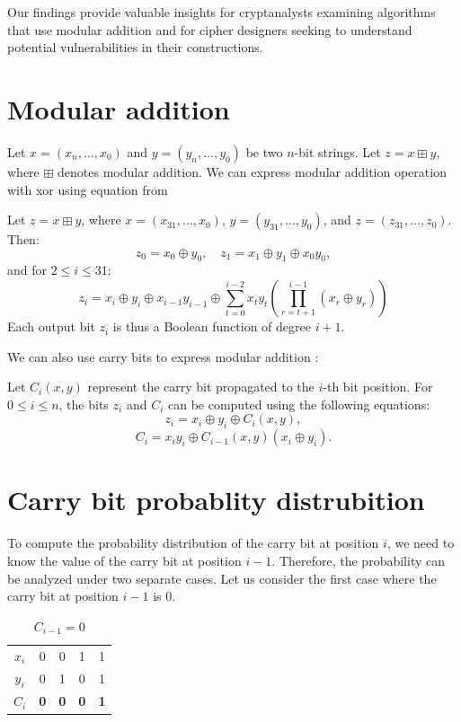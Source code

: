 \documentclass[runningheads]{llncs}
\begin{document}
Our findings provide valuable insights for cryptanalysts examining algorithms that use modular addition and for cipher designers seeking to understand potential vulnerabilities in their constructions.


\section{Modular addition}

Let \( x = (x_n, \dots, x_0) \) and \( y = (y_n, \dots, y_0) \) be two \( n \)-bit strings. Let \( z = x \boxplus y \), where \( \boxplus \) denotes modular addition. We can express modular addition operation with xor using equation from \cite{Dehnavi2014} 
\begin{lemma}
    Let \( z = x \boxplus y \), where \( x = (x_{31}, \ldots, x_0) \), \( y = (y_{31}, \ldots, y_0) \), and \( z = (z_{31}, \ldots, z_0) \). Then:
    \[
    z_0 = x_0 \oplus y_0, \quad z_1 = x_1 \oplus y_1 \oplus x_0 y_0,
    \]
    and for \( 2 \leq i \leq 31 \):
    \[
    z_i = x_i \oplus y_i \oplus x_{i-1} y_{i-1} \oplus \sum_{t=0}^{i-2} x_t y_t \left( \prod_{r=t+1}^{i-1} (x_r \oplus y_r) \right)
    \]
    Each output bit \( z_i \) is thus a Boolean function of degree \( i + 1 \).
\end{lemma}

We can also use carry bits to express modular addition :
\begin{lemma}
    Let \( C_i(x, y) \) represent the carry bit propagated to the \( i \)-th bit position. For \( 0 \leq i \leq n \), the bits \( z_i \) and \( C_i \) can be computed using the following equations:
    \[
    z_i = x_i \oplus y_i \oplus C_i(x,y),
    \]
    \[
    C_i = x_i y_i \oplus C_{i-1}(x,y)(x_i \oplus y_i).
    \]
\end{lemma}


\section{Carry bit probablity distrubition}

To compute the probability distribution of the carry bit at position \( i \), we need to know the value of the carry bit at position \( i-1 \). Therefore, the probability can be analyzed under two separate cases. Let us consider the first case where the carry bit at position \( i-1 \) is 0.

\begin{table}[h]
\centering
    \begin{tabular}{ c || c | c | c | c }
        $x_i$ & 0 & 0 & 1 & 1 \\ 
        $y_i$ & 0 & 1 & 0 & 1 \\ 
        \hline
        $C_i$ & \textbf{0} & \textbf{0} & \textbf{0} & \textbf{1}    
    \end{tabular}
    \caption{$C_{i-1} = 0$}
    \label{tab:1}
\end{table}
\end{document}
